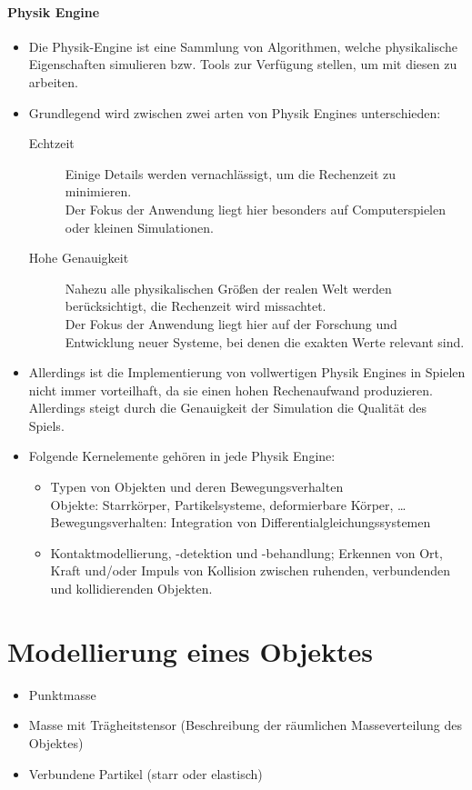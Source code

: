        \paragraph{Physik Engine}
	        \begin{itemize}
	        	\item Die Physik-Engine ist eine Sammlung von Algorithmen, welche physikalische Eigenschaften simulieren bzw. Tools zur Verfügung stellen, um mit diesen zu arbeiten.
	        	\item Grundlegend wird zwischen zwei arten von Physik Engines unterschieden:
		        	\begin{description}
		        		\item[Echtzeit] Einige Details werden vernachlässigt, um die Rechenzeit zu minimieren. \\ Der Fokus der Anwendung liegt hier besonders auf Computerspielen oder kleinen Simulationen.
		        		\item[Hohe Genauigkeit] Nahezu alle physikalischen Größen der realen Welt werden berücksichtigt, die Rechenzeit wird missachtet. \\ Der Fokus der Anwendung liegt hier auf der Forschung und Entwicklung neuer Systeme, bei denen die exakten Werte relevant sind.
		        	\end{description}
	        	\item Allerdings ist die Implementierung von vollwertigen Physik Engines in Spielen nicht immer vorteilhaft, da sie einen hohen Rechenaufwand produzieren. Allerdings steigt durch die Genauigkeit der Simulation die Qualität des Spiels.
	        	\item Folgende Kernelemente gehören in jede Physik Engine:
		        	\begin{itemize}
		        		\item Typen von Objekten und deren Bewegungsverhalten \\
			        		Objekte: Starrkörper, Partikelsysteme, deformierbare Körper, \dots \\
			        		Bewegungsverhalten: Integration von Differentialgleichungssystemen
			        	\item Kontaktmodellierung, -detektion und -behandlung; Erkennen von Ort, Kraft und/oder Impuls von Kollision zwischen ruhenden, verbundenden und kollidierenden Objekten.
		        	\end{itemize}
	        \end{itemize}

    \section{Modellierung eines Objektes} %
        \begin{itemize}
        	\item Punktmasse
        	\item Masse mit Trägheitstensor (Beschreibung der räumlichen Masseverteilung des Objektes)
        	\item Verbundene Partikel (starr oder elastisch)
        \end{itemize}

